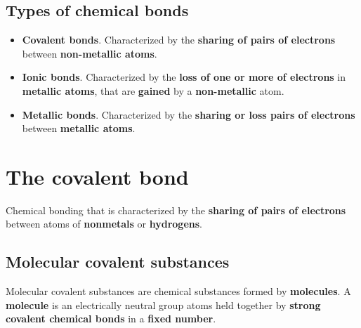 \documentclass{article}
\begin{document}
		\subsection*{Types of chemical bonds}

			\begin{itemize}
				\item \textbf{Covalent bonds}. Characterized by the \textbf{sharing of pairs of electrons} 
				between \textbf{non-metallic atoms}.
				\item \textbf{Ionic bonds}. Characterized by the \textbf{loss of one or more of electrons} 
				in \textbf{metallic atoms}, that are \textbf{gained} by a \textbf{non-metallic} atom.
				\item \textbf{Metallic bonds}. Characterized by the \textbf{sharing or loss pairs of electrons} 
				between \textbf{metallic atoms}.
			\end{itemize}
						
			\begin{center}
			\end{center}

	\section{The covalent bond}
			Chemical bonding that is characterized by the \textbf{sharing of pairs of electrons} 
			between atoms of \textbf{nonmetals} or \textbf{hydrogens}.

		\subsection{Molecular covalent substances}
			Molecular covalent substances are chemical substances formed by \textbf{molecules}. 
			A \textbf{molecule} is an electrically neutral group atoms held together by 
			\textbf{strong covalent chemical bonds}
			in a \textbf{fixed number}.
\end{document}
